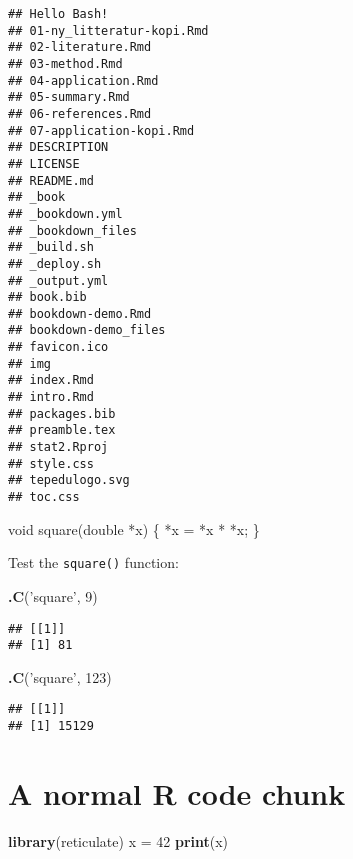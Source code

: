 \documentclass[]{book}
\newenvironment{Shaded}{\begin{snugshade}}{\end{snugshade}}
\newcommand{\DataTypeTok}[1]{\textcolor[rgb]{0.13,0.29,0.53}{#1}}
\newcommand{\DecValTok}[1]{\textcolor[rgb]{0.00,0.00,0.81}{#1}}
\newcommand{\KeywordTok}[1]{\textcolor[rgb]{0.13,0.29,0.53}{\textbf{#1}}}
\newcommand{\NormalTok}[1]{#1}
\newcommand{\StringTok}[1]{\textcolor[rgb]{0.31,0.60,0.02}{#1}}
\theoremstyle{definition}
\theoremstyle{definition}
\theoremstyle{definition}
\theoremstyle{remark}
\begin{document}
\begin{verbatim}
## Hello Bash!
## 01-ny_litteratur-kopi.Rmd
## 02-literature.Rmd
## 03-method.Rmd
## 04-application.Rmd
## 05-summary.Rmd
## 06-references.Rmd
## 07-application-kopi.Rmd
## DESCRIPTION
## LICENSE
## README.md
## _book
## _bookdown.yml
## _bookdown_files
## _build.sh
## _deploy.sh
## _output.yml
## book.bib
## bookdown-demo.Rmd
## bookdown-demo_files
## favicon.ico
## img
## index.Rmd
## intro.Rmd
## packages.bib
## preamble.tex
## stat2.Rproj
## style.css
## tepedulogo.svg
## toc.css
\end{verbatim}

\begin{Shaded}
\begin{Highlighting}[]
\DataTypeTok{void}\NormalTok{ square(}\DataTypeTok{double}\NormalTok{ *x) \{}
\NormalTok{  *x = *x * *x;}
\NormalTok{\}}
\end{Highlighting}
\end{Shaded}

Test the \texttt{square()} function:

\begin{Shaded}
\begin{Highlighting}[]
\KeywordTok{.C}\NormalTok{(}\StringTok{'square'}\NormalTok{, }\DecValTok{9}\NormalTok{)}
\end{Highlighting}
\end{Shaded}

\begin{verbatim}
## [[1]]
## [1] 81
\end{verbatim}

\begin{Shaded}
\begin{Highlighting}[]
\KeywordTok{.C}\NormalTok{(}\StringTok{'square'}\NormalTok{, }\DecValTok{123}\NormalTok{)}
\end{Highlighting}
\end{Shaded}

\begin{verbatim}
## [[1]]
## [1] 15129
\end{verbatim}

\hypertarget{a-normal-r-code-chunk}{%
\section{A normal R code chunk}\label{a-normal-r-code-chunk}}

\begin{Shaded}
\begin{Highlighting}[]
\KeywordTok{library}\NormalTok{(reticulate)}
\NormalTok{x =}\StringTok{ }\DecValTok{42}
\KeywordTok{print}\NormalTok{(x)}
\end{Highlighting}
\end{Shaded}
\end{document}
